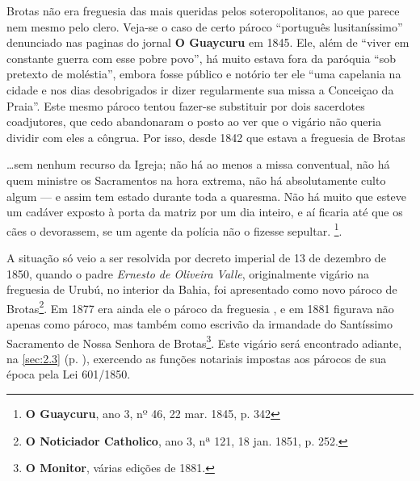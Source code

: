 Brotas não era freguesia das mais queridas pelos soteropolitanos, ao que parece nem mesmo pelo clero. Veja-se o caso de certo pároco ``português lusitaníssimo'' denunciado nas paginas do jornal \textbf{O Guaycuru} em 1845. Ele, além de ``viver em constante guerra com esse pobre povo'', há muito estava fora da paróquia ``sob pretexto de moléstia'', embora fosse público e notório ter ele ``uma capelania na cidade e nos dias desobrigados ir dizer regularmente sua missa a Conceiçao da Praia''. Este mesmo pároco tentou fazer-se substituir por dois sacerdotes coadjutores, que cedo abandonaram o posto ao ver que o vigário não queria dividir com eles a côngrua. Por isso, desde 1842 que estava a freguesia de Brotas 

\begin{citacao}
\dots sem nenhum recurso da Igreja; não há ao menos a missa conventual, não há quem ministre os Sacramentos na hora extrema, não há absolutamente culto algum --- e assim tem estado durante toda a quaresma. Não há muito que esteve um cadáver exposto à porta da matriz por um dia inteiro, e aí ficaria até que os cães o devorassem, se um agente da polícia não o fizesse sepultar. \footnote{\textbf{O Guaycuru}, ano 3, nº 46, 22 mar. 1845, p. 342}. 
\end{citacao}

A situação só veio a ser resolvida por decreto imperial de 13 de dezembro de 1850, quando o padre \textit{Ernesto de Oliveira Valle}, originalmente vigário na freguesia de Urubú, no interior da Bahia, foi apresentado como novo pároco de Brotas\footnote{\textbf{O Noticiador Catholico}, ano 3, nª 121, 18 jan. 1851, p. 252.}. Em 1877 era ainda ele o pároco da freguesia \cite[p.~176]{macosta_almana_1877}, e em 1881 figurava não apenas como pároco, mas também como escrivão da irmandade do Santíssimo Sacramento de Nossa Senhora de Brotas\footnote{\textbf{O Monitor}, várias edições de 1881.}. Este vigário será encontrado adiante, na \autoref{sec:2.3} (p. \pageref{sec:2.3}), exercendo as funções notariais impostas aos párocos de sua época pela Lei 601/1850.